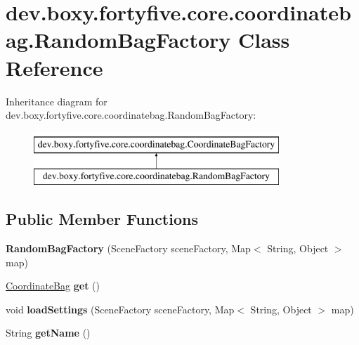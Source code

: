 \hypertarget{classdev_1_1boxy_1_1fortyfive_1_1core_1_1coordinatebag_1_1_random_bag_factory}{
\section{dev.boxy.fortyfive.core.coordinatebag.RandomBagFactory Class Reference}
\label{dc/d90/classdev_1_1boxy_1_1fortyfive_1_1core_1_1coordinatebag_1_1_random_bag_factory}
}
Inheritance diagram for dev.boxy.fortyfive.core.coordinatebag.RandomBagFactory:\begin{figure}[H]
\begin{center}
\leavevmode
\includegraphics[height=2.000000cm]{dc/d90/classdev_1_1boxy_1_1fortyfive_1_1core_1_1coordinatebag_1_1_random_bag_factory}
\end{center}
\end{figure}
\subsection*{Public Member Functions}
\begin{DoxyCompactItemize}
\item 
\hypertarget{classdev_1_1boxy_1_1fortyfive_1_1core_1_1coordinatebag_1_1_random_bag_factory_a848d02cd8279373ce3eb82aa145567de}{
{\bfseries RandomBagFactory} (SceneFactory sceneFactory, Map$<$ String, Object $>$ map)}
\label{dc/d90/classdev_1_1boxy_1_1fortyfive_1_1core_1_1coordinatebag_1_1_random_bag_factory_a848d02cd8279373ce3eb82aa145567de}

\item 
\hypertarget{classdev_1_1boxy_1_1fortyfive_1_1core_1_1coordinatebag_1_1_random_bag_factory_ab665e9eaf98f0240bfd42f82258a0985}{
\hyperlink{interfacedev_1_1boxy_1_1fortyfive_1_1core_1_1coordinatebag_1_1_coordinate_bag}{CoordinateBag} {\bfseries get} ()}
\label{dc/d90/classdev_1_1boxy_1_1fortyfive_1_1core_1_1coordinatebag_1_1_random_bag_factory_ab665e9eaf98f0240bfd42f82258a0985}

\item 
\hypertarget{classdev_1_1boxy_1_1fortyfive_1_1core_1_1coordinatebag_1_1_random_bag_factory_a51c8988e8c6b132b6799e7e7f708976b}{
void {\bfseries loadSettings} (SceneFactory sceneFactory, Map$<$ String, Object $>$ map)}
\label{dc/d90/classdev_1_1boxy_1_1fortyfive_1_1core_1_1coordinatebag_1_1_random_bag_factory_a51c8988e8c6b132b6799e7e7f708976b}

\item 
\hypertarget{classdev_1_1boxy_1_1fortyfive_1_1core_1_1coordinatebag_1_1_random_bag_factory_a12595a6e01c93fc9f2787cbedd9a0d65}{
String {\bfseries getName} ()}
\label{dc/d90/classdev_1_1boxy_1_1fortyfive_1_1core_1_1coordinatebag_1_1_random_bag_factory_a12595a6e01c93fc9f2787cbedd9a0d65}

\end{DoxyCompactItemize}
